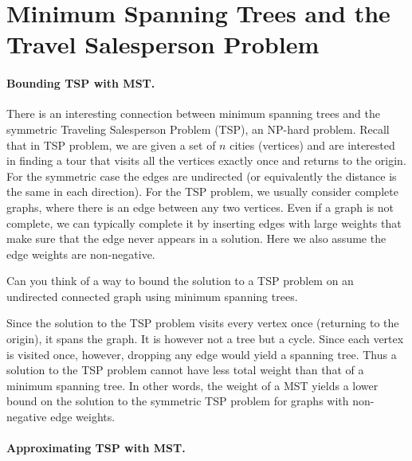 \section{Minimum Spanning Trees and the Travel Salesperson Problem }

\paragraph{Bounding TSP with MST.}

There is an interesting connection between minimum spanning trees and
the symmetric Traveling Salesperson Problem (TSP), an NP-hard problem.
Recall that in TSP problem, we are given a set of $n$ cities
(vertices) and are interested in finding a tour that visits all the
vertices exactly once and returns to the origin.  For the symmetric
case the edges are undirected (or equivalently the distance is the
same in each direction).  For the TSP problem, we usually consider
complete graphs, where there is an edge between any two vertices.
Even if a graph is not complete, we can typically complete it by
inserting edges with large weights that make sure that the edge never
appears in a solution.  Here we also assume the edge weights are
non-negative.

\begin{question}
Can you think of a way to bound the solution to a TSP problem on an
undirected connected graph using minimum spanning trees. 
\end{question}

Since the solution to the TSP problem visits every vertex once
(returning to the origin), it spans the graph.  It is however not a
tree but a cycle.  Since each vertex is visited once, however,
dropping any edge would yield a spanning tree.  Thus a solution to the
TSP problem cannot have less total weight than that of a minimum
spanning tree.  In other words, the weight of a MST yields a lower
bound on the solution to the symmetric TSP problem for graphs with
non-negative edge weights.

\paragraph{Approximating TSP with MST.}

